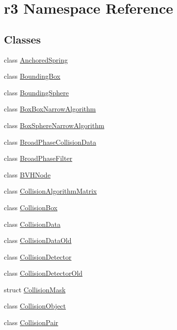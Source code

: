 \hypertarget{namespacer3}{}\section{r3 Namespace Reference}
\label{namespacer3}
\subsection*{Classes}
\begin{DoxyCompactItemize}
\item 
class \mbox{\hyperlink{classr3_1_1_anchored_spring}{Anchored\+Spring}}
\item 
class \mbox{\hyperlink{classr3_1_1_bounding_box}{Bounding\+Box}}
\item 
class \mbox{\hyperlink{classr3_1_1_bounding_sphere}{Bounding\+Sphere}}
\item 
class \mbox{\hyperlink{classr3_1_1_box_box_narrow_algorithm}{Box\+Box\+Narrow\+Algorithm}}
\item 
class \mbox{\hyperlink{classr3_1_1_box_sphere_narrow_algorithm}{Box\+Sphere\+Narrow\+Algorithm}}
\item 
class \mbox{\hyperlink{classr3_1_1_broad_phase_collision_data}{Broad\+Phase\+Collision\+Data}}
\item 
class \mbox{\hyperlink{classr3_1_1_broad_phase_filter}{Broad\+Phase\+Filter}}
\item 
class \mbox{\hyperlink{classr3_1_1_b_v_h_node}{B\+V\+H\+Node}}
\item 
class \mbox{\hyperlink{classr3_1_1_collision_algorithm_matrix}{Collision\+Algorithm\+Matrix}}
\item 
class \mbox{\hyperlink{classr3_1_1_collision_box}{Collision\+Box}}
\item 
class \mbox{\hyperlink{classr3_1_1_collision_data}{Collision\+Data}}
\item 
class \mbox{\hyperlink{classr3_1_1_collision_data_old}{Collision\+Data\+Old}}
\item 
class \mbox{\hyperlink{classr3_1_1_collision_detector}{Collision\+Detector}}
\item 
class \mbox{\hyperlink{classr3_1_1_collision_detector_old}{Collision\+Detector\+Old}}
\item 
struct \mbox{\hyperlink{structr3_1_1_collision_mask}{Collision\+Mask}}
\item 
class \mbox{\hyperlink{classr3_1_1_collision_object}{Collision\+Object}}
\item 
class \mbox{\hyperlink{classr3_1_1_collision_pair}{Collision\+Pair}}

\end{DoxyCompactItemize}
